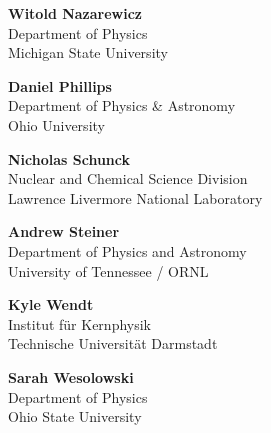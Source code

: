 \begin{minipage}[t]{0.5\linewidth}

\setlength\parskip{\baselineskip}

\textbf{Witold Nazarewicz}\\
Department of Physics\\
Michigan State University

\textbf{Daniel Phillips}\\
Department of Physics \& Astronomy\\
Ohio University

{\bf Nicholas Schunck}\\
Nuclear and Chemical Science Division \\
Lawrence Livermore National Laboratory

{\bf Andrew Steiner}\\
Department of Physics and Astronomy\\
University of Tennessee / ORNL

{\bf Kyle Wendt}\\
Institut für Kernphysik\\
Technische Universität Darmstadt

\textbf{Sarah Wesolowski}\\
Department of Physics\\ 
Ohio State University

\end{minipage}

